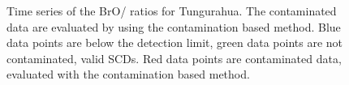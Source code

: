 \documentclass  [
  paper    = a4,
  BCOR     = 10mm,
  twoside,
  fontsize = 12pt,
  fleqn,
  toc      = bibnumbered,
  toc      = listofnumbered,
  numbers  = noendperiod,
  headings = normal,
  listof   = leveldown,
  version  = 3.03
]                                       {scrreprt}
\begin{document}
\begin{figure}
	\centering

	\caption{Time series of the BrO/ ratios for Tungurahua. The contaminated data are evaluated by using the contamination based method.  Blue data points are below the detection limit, green data points are not contaminated, valid  SCDs. Red data points are contaminated data, evaluated with the contamination based method.}
	\label{fig:tungso2novacsametime}
\end{figure}
\end{document}

